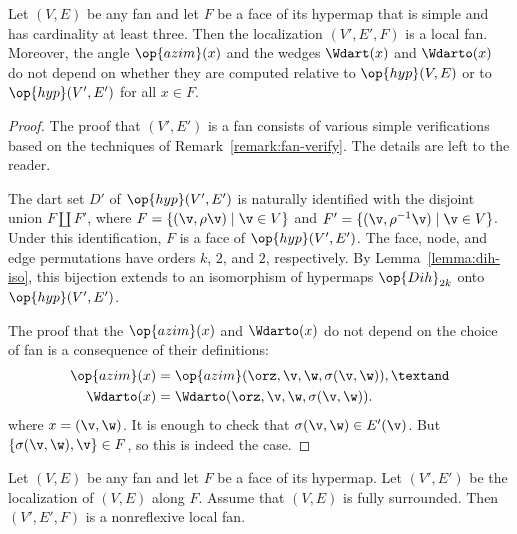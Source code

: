 \begin{lemma}[localization]%
\label{lemma:localization}
Let $(V,E)$ be any fan and let $F$ be a face of its hypermap that is
simple and has cardinality at least three.  Then the localization
$(V',E',F)$ is a local fan.  Moreover, the angle $\op{azim}(x)$ and
the wedges $\Wdart(x)$ and $\Wdarto(x)$ do not depend on whether they
are computed relative to $\op{hyp}(V,E)$ or to $\op{hyp}(V',E')$ for
all $x\in F$.
\end{lemma}



\begin{proof}
The proof that $(V',E')$ is a fan consists of various simple
verifications based on the techniques of
Remark~\ref{remark:fan-verify}.  The details are left to the reader.

The dart set $D'$ of $\op{hyp}(V',E')$ is naturally identified with
the disjoint union $F\coprod F'$, where $F = \{(\v,\rho\v) \mid \v\in
V\}$ and $F'=\{(\v,\rho^{-1}\v) \mid \v\in V\}$.  Under this
identification, $F$ is a face of $\op{hyp}(V',E')$.  The face, node,
and edge permutations have orders $k$, $2$, and $2$, respectively.  By
Lemma~\ref{lemma:dih-iso}, this bijection extends to an isomorphism of
hypermaps $\op{Dih}_{2k}$ onto $\op{hyp}(V',E')$.

The proof that the $\op{azim}(x)$ and $\Wdarto(x)$ do not depend on the
choice of fan is a consequence of their definitions:
\begin{align*}
\op{azim}(x) &= \op{azim}(\orz,\v,\w,\sigma(\v,\w)),\textand \\
\Wdarto(x) &= \Wdarto(\orz,\v,\w,\sigma(\v,\w)).\\
\end{align*}
where $x = (\v,\w)$.  It is enough to check that $\sigma(\v,\w)\in
E'(\v)$.  But $\{\sigma(\v,\w),\v\}\in F$, so this is indeed the case.
\end{proof}

\begin{lemma}[]\cutrate{}\label{lemma:localize-nonreflexive} 
Let $(V,E)$ be any fan and
  let $F$ be a face of its hypermap.  Let $(V',E')$ be the
  localization of $(V,E)$ along $F$.  Assume that $(V,E)$ is fully surrounded.
  Then $(V',E',F)$ is a nonreflexive local fan.
\end{lemma}

